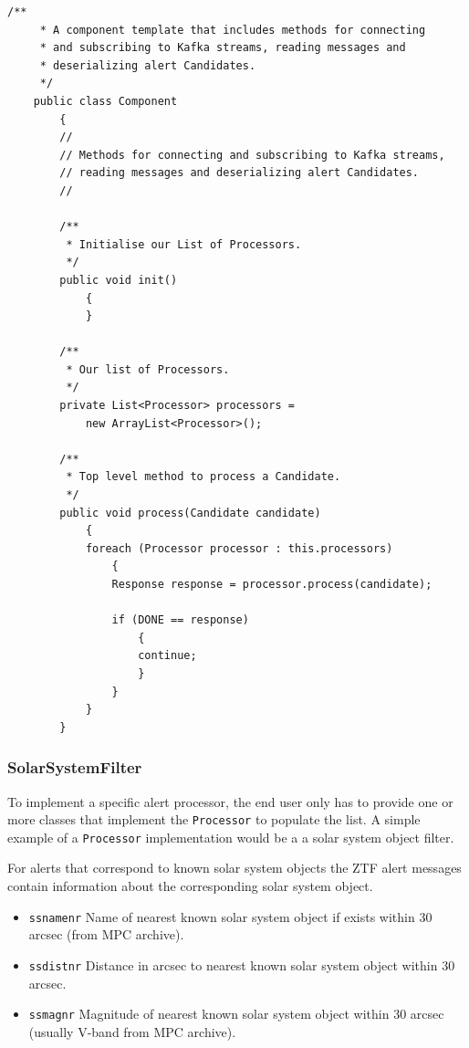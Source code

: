 \documentclass{article}
\newcommand{\ztf} {ZTF\xspace}
\begin{document}
\begin{lstlisting}[style=Java]
    /**
     * A component template that includes methods for connecting
     * and subscribing to Kafka streams, reading messages and
     * deserializing alert Candidates.
     */
    public class Component
        {
        //
        // Methods for connecting and subscribing to Kafka streams,
        // reading messages and deserializing alert Candidates.
        //

        /**
         * Initialise our List of Processors.
         */
        public void init()
            {
            }

        /**
         * Our list of Processors.
         */
        private List<Processor> processors =
            new ArrayList<Processor>();

        /**
         * Top level method to process a Candidate.
         */
        public void process(Candidate candidate)
            {
            foreach (Processor processor : this.processors)
                {
                Response response = processor.process(candidate);

                if (DONE == response)
                    {
                    continue;
                    }
                }
            }
        }
\end{lstlisting}

\subsubsection{SolarSystemFilter}
\label{java-interfaces.SolarSystemFilter}

To implement a specific alert processor, the end user only has to provide one or more classes that implement the \texttt{Processor} to populate the list. A simple example of a \texttt{Processor} implementation would be a a solar system object filter.

For alerts that correspond to known solar system objects the \ztf alert messages contain information about the corresponding solar system object.

\begin{itemize}
  \item \texttt{ssnamenr} Name of nearest known solar system object if exists within 30 arcsec (from MPC archive).
  \item \texttt{ssdistnr} Distance in arcsec to nearest known solar system object within 30 arcsec.
  \item \texttt{ssmagnr} Magnitude of nearest known solar system object within 30 arcsec (usually V-band from MPC archive).
\end{itemize}
\end{document}
